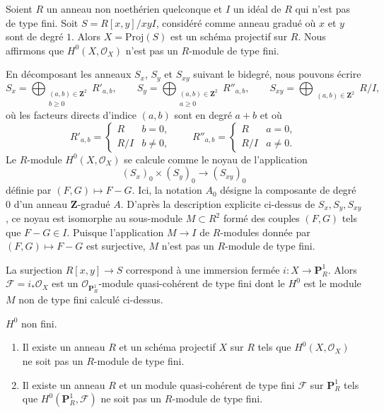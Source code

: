 \noindent
Soient $R$ un anneau non noethérien quelconque et $I$ un idéal de $R$
qui n'est pas de type fini. Soit $S = R[x, y]/xyI$, considéré
comme anneau gradué où $x$ et $y$ sont de degré $1$.
Alors $X = \text{Proj}(S)$ est un schéma projectif sur $R$.
Nous affirmons que $H^0(X, \mathcal{O}_X)$ n'est pas
un $R$-module de type fini.

\medskip\noindent
En décomposant les anneaux $S_x$, $S_y$ et $S_{xy}$ suivant le bidegré,
nous pouvons écrire
$$
S_x = \bigoplus_{\substack{(a, b) \in \mathbf{Z}^2 \\ b \geq 0}} R'_{a, b},
\quad\quad
S_y = \bigoplus_{\substack{(a, b) \in \mathbf{Z}^2 \\ a \geq 0}} R''_{a, b},
\quad\quad
S_{xy} = \bigoplus_{\substack{(a, b) \in \mathbf{Z}^2}} R/I,
$$
où les facteurs directs d'indice $(a, b)$ sont en degré $a + b$ et où
$$
R'_{a, b} =
\left\{
\begin{matrix}
R & b = 0, \\
R/I & b \ne 0,
\end{matrix}
\right.
\quad\quad
R''_{a, b} =
\left\{
\begin{matrix}
R & a = 0, \\
R/I & a \ne 0.
\end{matrix}
\right.
$$
Le $R$-module $H^0(X, \mathcal{O}_X)$ se calcule comme le noyau de l'application
$$
(S_x)_0 \times (S_y)_0 \to (S_{xy})_0
$$
définie par $(F, G) \mapsto F - G$. Ici, la notation $A_0$ désigne la
composante de degré $0$ d'un anneau $\mathbf{Z}$-gradué $A$. D'après la description explicite
ci-dessus de $S_x, S_y, S_{xy}$, ce noyau est isomorphe
au sous-module $M \subset R^2$ formé des couples $(F, G)$
tels que $F - G \in I$. Puisque l'application $M \to I$ de $R$-modules
donnée par $(F, G) \mapsto F - G$ est surjective,
$M$ n'est pas un $R$-module de type fini.

\medskip\noindent
La surjection $R[x, y] \to S$ correspond à une
immersion fermée $i : X \to \mathbf{P}^1_R$. Alors $\mathcal{F} = i_*\mathcal{O}_X$
est un $\mathcal{O}_{\mathbf{P}^1_R}$-module quasi-cohérent de type fini
dont le $H^0$ est le module $M$ non de type fini
calculé ci-dessus.

\begin{lemma}
\label{lemma-nonfinite-h0}
$H^0$ non fini.
\begin{enumerate}
\item Il existe un anneau $R$ et un schéma projectif $X$
sur $R$ tels que $H^0(X, \mathcal{O}_X)$ ne soit pas
un $R$-module de type fini.
\item Il existe un anneau $R$ et un module quasi-cohérent de type fini
$\mathcal{F}$ sur $\mathbf{P}^1_R$ tels que
$H^0(\mathbf{P}^1_R, \mathcal{F})$ ne soit pas un $R$-module de type fini.
\end{enumerate}
\end{lemma}

